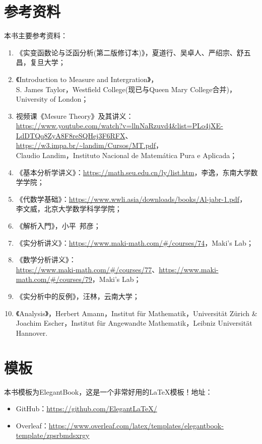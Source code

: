 \section*{参考资料}
本书主要参考资料：
\begin{enumerate}
    \item 《实变函数论与泛函分析(第二版修订本)》，夏道行、吴卓人、严绍宗、舒五昌，复旦大学；
    \item 《Introduction to Measure and Intergration》，\\ S. James Taylor，Westfield College(现已与Queen Mary College合并)，University of London；
    \item 视频课《Mesure Theory》及其讲义：\\ \url{https://www.youtube.com/watch?v=llnNaRzuvd4&list=PLo4jXE-LdDTQq8ZyA8F8reSQHej3F6RFX}、\url{https://w3.impa.br/~landim/Cursos/MT.pdf}，\\ Claudio Landim，Instituto Nacional de Matem\'{a}tica Pura e Aplicada；
    \item 《基本分析学讲义》：\url{https://math.seu.edu.cn/ly/list.htm}，李逸，东南大学数学学院；
    \item 《代数学基础》：\url{https://www.wwli.asia/downloads/books/Al-jabr-1.pdf}，\\ 李文威，北京大学数学科学学院；
    \item 《解析入門》，小平\ 邦彦；
    \item 《实分析讲义》：\url{https://www.maki-math.com/#/courses/74}，Maki's Lab；
    \item 《数学分析讲义》：\\ \url{https://www.maki-math.com/#/courses/77}、\url{https://www.maki-math.com/#/courses/79}，Maki's Lab；
    \item 《实分析中的反例》，汪林，云南大学；
    \item 《Analysis》，Herbert Amann，Institut f\"{u}r Mathematik，Universit\"{a}t Z\"{u}rich \& Joachim Escher，Institut f\"{u}r Angewandte Mathematik，Leibniz Universit\"{a}t Hannover.
\end{enumerate}

\section*{模板}
本书模板为ElegantBook，这是一个非常好用的\LaTeX{}模板！地址：
\begin{itemize}
    \item GitHub：\url{https://github.com/ElegantLaTeX/}
    \item Overleaf：\url{https://www.overleaf.com/latex/templates/elegantbook-template/zpsrbmdsxrgy}
\end{itemize}





